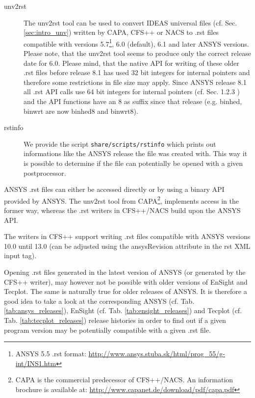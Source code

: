 \begin{description}
\item[unv2rst] The unv2rst  tool can be used to  convert IDEAS universal files
(cf.  Sec.  \ref{sec:intro_unv}) written by  CAPA, CFS++ or NACS to .rst files
compatible    with    versions    5.7\footnote{ANSYS    5.5    .rst    format:
\url{http://www.ansys.stuba.sk/html/prog_55/g-int/INS1.htm}},  6.0  (default),
6.1 and  later ANSYS versions.   Please note, that  the unv2rst tool  seems to
produce only  the correct release date  for 6.0. Please mind,  that the native
API for writing of  these older .rst files before release 8.1  has used 32 bit
integers for  internal pointers and  therefore some restrictions in  file size
may apply. Since ANSYS release 8.1 all  .rst API calls use 64 bit integers for
internal pointers (cf.  Sec.  1.2.3 \cite{ANSYSProgrammersManual2009}) and the
API functions have an 8 as  suffix since that release (e.g. binhed, binwrt are
now binhed8 and binwrt8).

\item[rstinfo]  We  provide the   script {\tt  share/scripts/rstinfo}
which  prints out informations  like the  ANSYS release  the file  was created
with. This  way it  is possible to  determine if  the file can  potentially be
opened with a given postprocessor.

\end{description}

ANSYS .rst  files can  either be accessed  directly or  by using a  binary API
provided by ANSYS.  The unv2rst tool from CAPA\footnote{CAPA is the commercial
predecessor  of   CFS++/NACS.  An   information  brochure  is   available  at:
\url{http://www.capanet.de/download/pdf/capa.pdf}},  implements access  in the
former way, whereas the .rst writers in CFS++/NACS build upon the ANSYS API.

The writers in CFS++ support writing .rst files compatible with ANSYS versions
10.0 until 13.0 (can be adjusted  using the ansysRevision attribute in the rst
XML input tag).

   Opening .rst files  generated in the latest version  of ANSYS (or generated
by  the CFS++  writer), may  however not  be possible  with older  versions of
EnSight  and  Tecplot.  The  same  is naturally  true  for  older releases  of
ANSYS. It is therefore  a good idea to take a look  at the corresponding ANSYS
(cf.      Tab.       \ref{tab:ansys_releases}),     EnSight     (cf.      Tab.
\ref{tab:ensight_releases}) and  Tecplot (cf. Tab. \ref{tab:tecplot_releases})
release  histories in order  to find  out if  a given  program version  may be
potentially compatible with a given .rst file.

